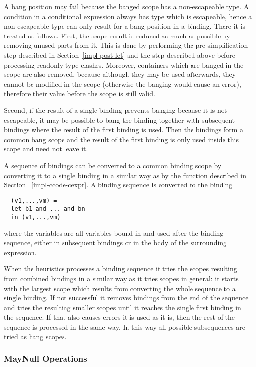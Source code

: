 A bang position may fail because the banged scope has a non-escapeable type. A condition in a conditional expression always
has type  which is escapeable, hence a non-escapeable type can only result for a bang position in a binding. There
it is treated as follows. First, the scope result is reduced as much as possible by removing unused parts from it.
This is done by performing the pre-simplification step  described in Section~\ref{impl-post-let} and the step
 described above before processing readonly type clashes. Moreover, containers which are banged in the scope
are also removed, because although they may be used afterwards, they cannot be modified in the scope (otherwise the banging
would cause an error), therefore their value before the scope is still valid.

Second, if the result of a single binding prevents banging because it is not escapeable, it may be possible to bang the binding
together with subsequent bindings where the result of the first binding is used. Then the bindings form a common bang scope
and the result of the first binding is only used inside this scope and need not leave it.

A sequence of bindings can be converted to a common binding scope by converting it to a single binding in a similar way as by
the function  described in Section ~\ref{impl-ccode-cexpr}. A binding sequence  is converted
to the binding
\begin{verbatim}
  (v1,...,vm) =
  let b1 and ... and bn
  in (v1,...,vm)
\end{verbatim}
where the variables  are all variables bound in  and used after the binding sequence, either
in subsequent bindings or in the body of the surrounding  expression.

When the heuristics processes a binding sequence it tries the scopes resulting from combined bindings in a similar way as it
tries scopes in general: it starts with the largest scope which results from converting the whole sequence to a single binding.
If not successful it removes bindings from the end of the sequence and tries the resulting smaller scopes until it reaches the
single first binding in the sequence. If that also causes errors it is used as it is, then the rest of the sequence is processed
in the same way. In this way all possible subsequences are tried as bang scopes.

\subsubsection{MayNull Operations}

